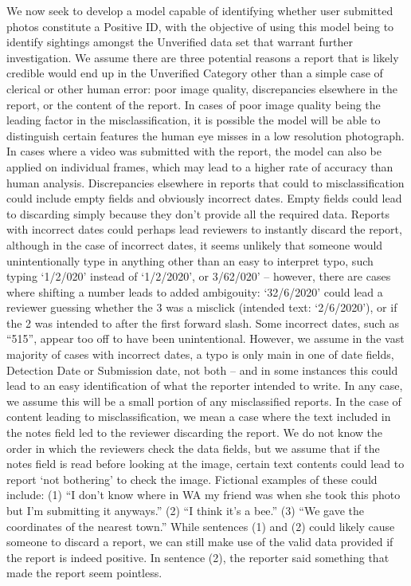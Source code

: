 \documentclass[2126824.tex]{subfiles}
\begin{document}
We now seek to develop a model capable of identifying whether user submitted photos constitute a Positive ID, with the objective of using this model being to identify sightings amongst the Unverified data set that warrant further investigation. We assume there are three potential reasons a report that is likely credible would end up in the Unverified Category other than a simple case of clerical or other human error: poor image quality, discrepancies elsewhere in the report, or the content of the report. In cases of poor image quality being the leading factor in the misclassification, it is possible the model will be able to distinguish certain features the human eye misses in a low resolution photograph. In cases where a video was submitted with the report, the model can also be applied on individual frames, which may lead to a higher rate of accuracy than human analysis. 
Discrepancies elsewhere in reports that could to misclassification could include empty fields and obviously incorrect dates.  Empty fields could lead to discarding simply because they don’t provide all the required data. Reports with incorrect dates could perhaps lead reviewers to instantly discard the report, although in the case of incorrect dates, it seems unlikely that someone would unintentionally type in anything other than an easy to interpret typo, such typing ‘1/2/020’ instead of ‘1/2/2020’, or 3/62/020’ – however, there are cases where shifting a number leads to added ambigouity: ‘32/6/2020’ could lead a reviewer guessing whether the 3 was a misclick (intended text: ‘2/6/2020’), or if the 2 was intended to after the first forward slash. Some incorrect dates, such as “515”, appear too off to have been unintentional. However, we assume in the vast majority of cases with incorrect dates, a typo is only main in one of date fields, Detection Date or Submission date, not both – and in some instances this could lead to an easy identification of what the reporter intended to write. In any case, we assume this will be a small portion of any misclassified reports. 
In the case of content leading to misclassification, we mean a case where the text included in the notes field led to the reviewer discarding the report. We do not know the order in which the reviewers check the data fields, but we assume that if the notes field is read before looking at the image, certain text contents could lead to report ‘not bothering’ to check the image. Fictional examples of these could include:
(1)	“I don’t know where in WA my friend was when she took this photo but I’m submitting it anyways.”
(2)	“I think it’s a bee.”
(3)	“We gave the coordinates of the nearest town.”
While sentences (1) and (2) could likely cause someone to discard a report, we can still make use of the valid data provided if the report is indeed positive. In sentence (2), the reporter said something that made the report seem pointless. 
\end{document}
